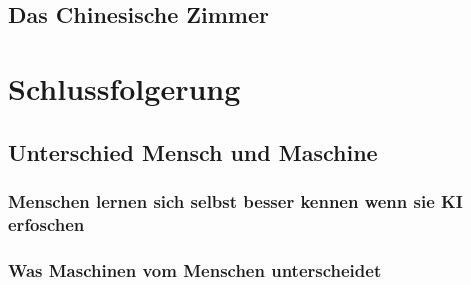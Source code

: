 \documentclass[12pt,german,ngerman]{report}
\begin{document}
    \section{Das Chinesische Zimmer}

\chapter{Schlussfolgerung}
    \section{Unterschied Mensch und Maschine}
        \subsection{Menschen lernen sich selbst besser kennen wenn sie KI erfoschen}
        \subsection{Was Maschinen vom Menschen unterscheidet}

    \printbibliography[title={Quellenverzeichnis}]
\end{document}
